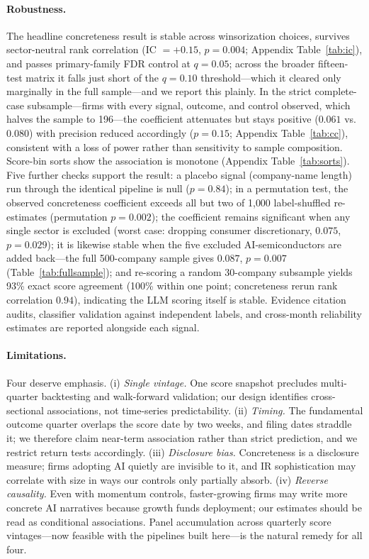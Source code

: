 \documentclass[11pt]{article}
\newcommand{\coef}[1]{\ensuremath{#1}}
\begin{document}
\paragraph{Robustness.} The headline concreteness result is stable across
winsorization choices, survives sector-neutral rank correlation
(IC $=+0.15$, $p=0.004$; Appendix Table~\ref{tab:ic}), and passes
primary-family FDR control at $q=0.05$; across the broader fifteen-test matrix
it falls just short of the $q=0.10$ threshold---which it cleared only
marginally in the full sample---and we report this plainly. In the strict
complete-case subsample---firms with every signal, outcome, and control
observed, which halves the sample to 196---the coefficient attenuates but stays
positive (\coef{0.061} vs.\ \coef{0.080}) with precision reduced accordingly
($p=0.15$; Appendix Table~\ref{tab:cc}), consistent with a loss of power
rather than sensitivity to sample composition. Score-bin sorts show the
association is monotone (Appendix Table~\ref{tab:sorts}). Five further checks
support the result: a placebo signal (company-name length) run through the
identical pipeline is null ($p=0.84$); in a permutation test, the observed
concreteness coefficient exceeds all but two of 1{,}000 label-shuffled
re-estimates (permutation $p=0.002$); the coefficient remains significant when
any single sector is excluded (worst case: dropping consumer discretionary,
\coef{0.075}, $p=0.029$); it is likewise stable when the five excluded
AI-semiconductors are added back---the full 500-company sample gives
\coef{0.087}, $p=0.007$ (Table~\ref{tab:fullsample}); and re-scoring a random
30-company subsample yields 93\% exact score agreement (100\% within one point;
concreteness rerun rank correlation $0.94$), indicating the LLM scoring itself
is stable. Evidence citation audits,
classifier validation against independent labels, and cross-month reliability
estimates are reported alongside each signal.

\paragraph{Limitations.} Four deserve emphasis. (i) \emph{Single vintage.} One
score snapshot precludes multi-quarter backtesting and walk-forward validation;
our design identifies cross-sectional associations, not time-series
predictability. (ii) \emph{Timing.} The fundamental outcome quarter overlaps
the score date by two weeks, and filing dates straddle it; we therefore claim
near-term association rather than strict prediction, and we restrict return
tests accordingly. (iii) \emph{Disclosure bias.} Concreteness is a disclosure
measure; firms adopting AI quietly are invisible to it, and IR sophistication
may correlate with size in ways our controls only partially absorb.
(iv) \emph{Reverse causality.} Even with momentum controls, faster-growing
firms may write more concrete AI narratives because growth funds deployment;
our estimates should be read as conditional associations. Panel accumulation
across quarterly score vintages---now feasible with the pipelines built
here---is the natural remedy for all four.
\end{document}
